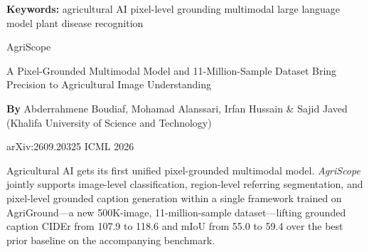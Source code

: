 \documentclass[10pt,twocolumn]{article}
\begin{document}
\setlength{\parindent}{0pt}
\setlength{\parskip}{4pt}

{\small\color{keywordgray}\textbf{Keywords:}
  agricultural AI \textbullet{}
  pixel-level grounding \textbullet{}
  multimodal large language model \textbullet{}
  plant disease recognition}\par\vspace{4pt}

{\LARGE\bfseries\raggedright
  AgriScope}\par\vspace{4pt}

{\large\itshape\raggedright
  A Pixel-Grounded Multimodal Model and 11-Million-Sample Dataset
  Bring Precision to Agricultural Image Understanding}\par\vspace{6pt}

{\small\textbf{By} Abderrahmene Boudiaf, Mohamad Alanssari, Irfan Hussain
  \& Sajid Javed (Khalifa University of Science and Technology)}\par\vspace{2pt}

{\small\color{keywordgray}arXiv:2609.20325 \textbullet{} ICML 2026}
\par\vspace{2pt}\noindent{\color{rulered}\rule{\columnwidth}{0.6pt}}\vspace{6pt}

Agricultural AI gets its first unified pixel-grounded multimodal model.
\textit{AgriScope} jointly supports image-level classification, region-level
referring segmentation, and pixel-level grounded caption generation within
a single framework trained on AgriGround---a new 500K-image,
11-million-sample dataset---lifting grounded caption CIDEr from 107.9 to
118.6 and mIoU from 55.0 to 59.4 over the best prior baseline on
the accompanying benchmark.
\end{document}
